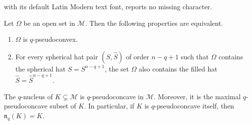 \documentclass[10pt,a4paper]{amsart}
\newcommand{\Mcal}{\mathcal{M}}
\newcommand{\nuc}{\mathfrak{n}}
\begin{document}
with its default Latin Modern text font, reports no missing character.
\begin{prop} \label{prop-qpsc-caps} Let $\Omega$ be an open set in $\Mcal$. Then the following properties are equivalent.

\begin{enumerate}

\item \label{prop-qpsc-caps-1}  $\Omega$ is $q$-pseudoconvex.

\item \label{prop-qpsc-caps-4} For every spherical hat pair $(S,\widehat{S})$ of order $n-q+1$ such that $\Omega$ contains the spherical hat $S=S^{n-q+1}$, the set $\Omega$ also contains the filled hat $\widehat{S}=\widehat{S}^{n-q+1}$.



\end{enumerate}

\end{prop}

\begin{prop}\label{prop-qnuc-qpsc} The $q$-nucleus of $K \subsetneq \Mcal$ is $q$-pseudoconcave in $\Mcal$. Moreover, it is the maximal $q$-pseudoconcave subset of $K$. In particular, if $K$ is $q$-pseudoconcave itself, then $\nuc_q(K)=K$. 
\end{prop}
\end{document}

